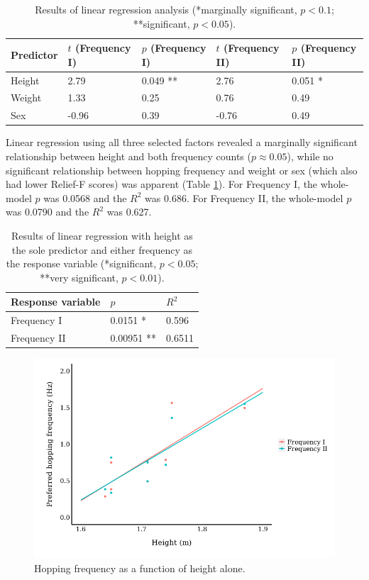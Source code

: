 \documentclass{article}
\begin{document}
\begin{table}[h!]
\centering
\begin{tabularx}{\linewidth}{@{}lXlXl@{}}
\toprule
Predictor & $t$ (Frequency I) & $p$ (Frequency I) & $t$ (Frequency II) & $p$ (Frequency II) \\ \midrule
Height    & 2.79                                   & 0.049 **                                 & 2.76                   & 0.051 *                  \\
Weight    & 1.33                                   & 0.25                                     & 0.76                   & 0.49                     \\
Sex       & -0.96                                   & 0.39                                     & -0.76                   & 0.49                     \\ \bottomrule
\end{tabularx}
\caption{\centering Results of linear regression analysis (*marginally significant, $p < 0.1$; **significant, $p < 0.05$).}
\label{fig:lms}
\end{table}

Linear regression using all three selected factors revealed a marginally significant relationship between height and both frequency counts ($p \approx 0.05$), while no significant relationship between hopping frequency and weight or sex (which also had lower Relief-F scores) was apparent (Table \ref{fig:lms}). For Frequency I, the whole-model $p$ was 0.0568 and the $R^2$ was 0.686. For Frequency II, the whole-model $p$ was 0.0790 and the $R^2$ was 0.627.

\begin{table}[h!]
\centering
\begin{tabular}{@{}lll@{}}
\toprule
Response variable & $p$ & $R^2$ \\ \midrule
Frequency I & 0.0151 * & 0.596 \\
Frequency II & 0.00951 ** & 0.6511 \\ \bottomrule
\end{tabular}
\caption{Results of linear regression with height as the sole predictor and either frequency as the response variable  (*significant, $p < 0.05$; **very significant, $p < 0.01$).}
\label{fig:heightlm}
\end{table}

\begin{figure}[h!]
\centering
\includegraphics[width=0.75\linewidth]{plots/height.png}
\caption{Hopping frequency as a function of height alone.}
\label{fig:scatter}
\end{figure}
\end{document}
